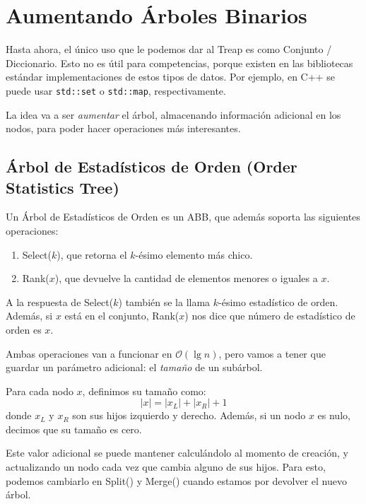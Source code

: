 \section{Aumentando Árboles Binarios}

Hasta ahora, el único uso que le podemos dar al Treap es como Conjunto / Diccionario. 
Esto no es útil para competencias, porque existen en las bibliotecas estándar implementaciones de estos tipos de datos. 
Por ejemplo, en C++ se puede usar \texttt{std::set} o \texttt{std::map}, respectivamente.

La idea va a ser \textit{aumentar} el árbol, almacenando información adicional en los nodos, para poder hacer operaciones más interesantes. 

\subsection[Árbol de Estadísticos de Orden (Order Statistics Tree)]{Árbol de Estadísticos de Orden \newline (Order Statistics Tree)}
\label{sec:order-statistics-tree}

Un Árbol de Estadísticos de Orden es un ABB, que además soporta las siguientes operaciones:

\begin{enumerate}
    \item Select(\(k\)), que retorna el \(k\)-ésimo elemento más chico.
    \item Rank(\(x\)), que devuelve la cantidad de elementos menores o iguales a \(x\).
\end{enumerate}

A la respuesta de Select(\(k\)) también se la llama \(k\)-ésimo estadístico de orden. Además, si \(x\) está en el conjunto, Rank(\(x\)) nos dice que número de estadístico de orden es \(x\).

Ambas operaciones van a funcionar en \(\mathcal{O}(\lg n)\), pero vamos a tener que guardar un parámetro adicional: el \textit{tamaño} de un subárbol.

Para cada nodo \(x\), definimos su tamaño como:
\[
|x| = |x_L| + |x_R| + 1
\]
donde \(x_L\) y \(x_R\) son sus hijos izquierdo y derecho.
Además, si un nodo \(x\) es nulo, decimos que su tamaño es cero.

Este valor adicional se puede mantener calculándolo al momento de creación, y actualizando un nodo cada vez que cambia alguno de sus hijos.
Para esto, podemos cambiarlo en Split() y Merge() cuando estamos por devolver el nuevo árbol.

